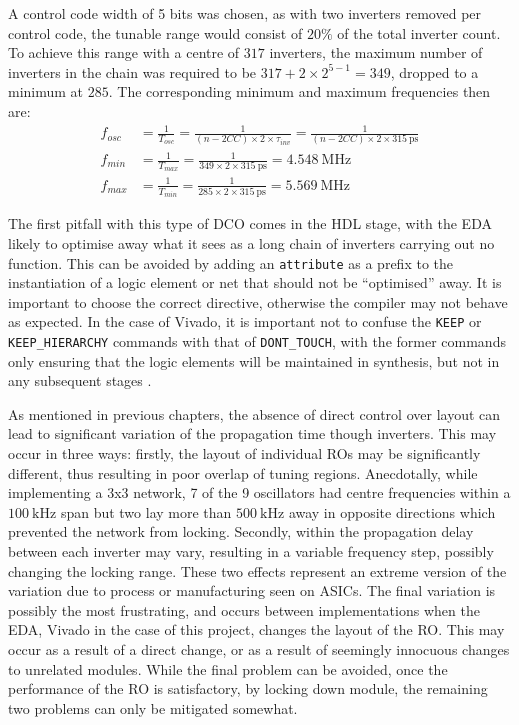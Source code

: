 A control code width of 5 bits was chosen, as with two inverters removed per control code, the tunable range would consist of $20\%$ of the total inverter count. To achieve this range with a centre of $317$ inverters, the maximum number of inverters in the chain was required to be $317+2\times 2^{5-1} = 349$, dropped to a minimum at $285$. The corresponding minimum and maximum frequencies then are:
\begin{align}
f_{osc} &= \frac{1}{T_{osc}} = \frac{1}{(n-2CC)\times 2\times\tau_{inv}} = \frac{1}{(n-2CC)\times 2\times 315~\si{\pico\second}} \\
f_{min} &= \frac{1}{T_{max}} = \frac{1}{349\times 2\times 315~\si{\pico\second}} = 4.548~\si{\mega\hertz} \\
f_{max} &= \frac{1}{T_{min}} = \frac{1}{285\times 2\times 315~\si{\pico\second}} = 5.569~\si{\mega\hertz}
\end{align}

The first pitfall with this type of \ac{DCO} comes in the \ac{HDL} stage, with the \ac{EDA} likely to optimise away what it sees as a long chain of inverters carrying out no function. This can be avoided by adding an \texttt{attribute} as a prefix to the instantiation of a logic element or net that should not be ``optimised'' away. It is important to choose the correct directive, otherwise the compiler may not behave as expected. In the case of Vivado, it is important not to confuse the \texttt{KEEP} or \texttt{KEEP\_HIERARCHY} commands with that of \texttt{DONT\_TOUCH}, with the former commands only ensuring that the logic elements will be maintained in synthesis, but not in any subsequent stages \cite{synth_ug}.

As mentioned in previous chapters, the absence of direct control over layout can lead to significant variation of the propagation time though inverters. This may occur in three ways: firstly, the layout of individual \acp{RO} may be significantly different, thus resulting in poor overlap of tuning regions. Anecdotally, while implementing a 3x3 network, 7 of the 9 oscillators had centre frequencies within a $100~\si{\kilo\hertz}$ span but two lay more than $500~\si{\kilo\hertz}$ away in opposite directions which prevented the network from locking. Secondly, within  the propagation delay between each inverter may vary, resulting in a variable frequency step, possibly changing the locking range. These two effects represent an extreme version of the variation due to process or manufacturing seen on \acp{ASIC}. The final variation is possibly the most frustrating, and occurs between implementations when the \ac{EDA}, Vivado in the case of this project, changes the layout of the \ac{RO}. This may occur as a result of a direct change, or as a result of seemingly innocuous changes to unrelated modules. While the final problem can be avoided, once the performance of the \ac{RO} is satisfactory, by locking down module, the remaining two problems can only be mitigated somewhat.

